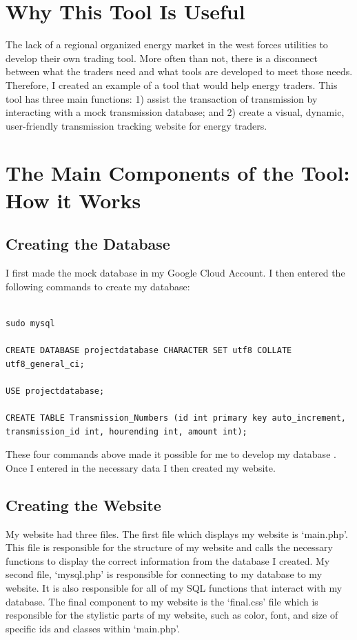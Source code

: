 \documentclass{article}
\begin{document}
\section{Why This Tool Is Useful}
\label{sec:headings}
The lack of a regional organized energy market in the west forces utilities to develop their own trading tool. More often than not, there is a disconnect between what the traders need and what tools are developed to meet those needs. Therefore, I created an example of a tool that would help energy traders. This tool has three main functions: 1) assist the transaction of transmission by interacting with a mock transmission database; and 2) create a visual, dynamic, user-friendly transmission tracking website for energy traders.

\section{The Main Components of the Tool: How it Works}
\subsection{Creating the Database}
I first made the mock database in my Google Cloud Account. I then entered the following commands to create my database: 

\begin{verbatim}

sudo mysql

CREATE DATABASE projectdatabase CHARACTER SET utf8 COLLATE utf8_general_ci; 

USE projectdatabase; 

CREATE TABLE Transmission_Numbers (id int primary key auto_increment, transmission_id int, hourending int, amount int);

\end{verbatim}


These four commands above made it possible for me to develop my database \cite{aaa}. Once I entered in the necessary data I then created my website. 

\subsection{Creating the Website}

My website had three files. The first file which displays my website is ‘main.php’. This file is responsible for the structure of my website and calls the necessary functions to display the correct information from the database I created. My second file, ‘mysql.php’ is responsible for connecting to my database to my website. It is also responsible for all of my SQL functions that interact with my database. The final component to my website is the ‘final.css’ file which is responsible for the stylistic parts of my website, such as color, font, and size of specific ids and classes within ‘main.php’. 
\end{document}
